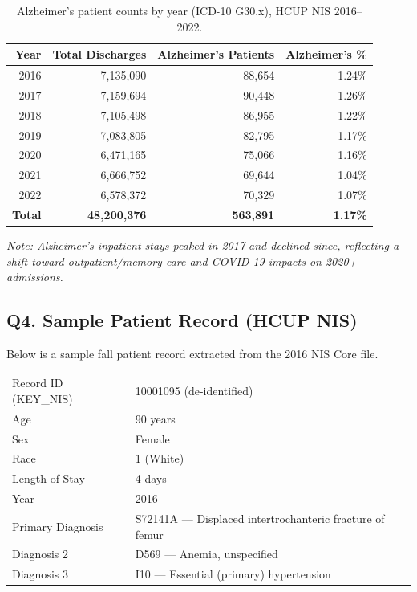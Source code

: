 \documentclass[11pt, a4paper]{article}
\begin{document}
\begin{table}[H]
\centering
\renewcommand{\arraystretch}{1.3}
\begin{tabular}{rrrr}
\toprule
\textbf{Year} & \textbf{Total Discharges} & \textbf{Alzheimer's Patients} & \textbf{Alzheimer's \%} \\
\midrule
2016 & 7,135,090 &  88,654 & 1.24\% \\
2017 & 7,159,694 &  90,448 & 1.26\% \\
2018 & 7,105,498 &  86,955 & 1.22\% \\
2019 & 7,083,805 &  82,795 & 1.17\% \\
2020 & 6,471,165 &  75,066 & 1.16\% \\
2021 & 6,666,752 &  69,644 & 1.04\% \\
2022 & 6,578,372 &  70,329 & 1.07\% \\
\midrule
\textbf{Total} & \textbf{48,200,376} & \textbf{563,891} & \textbf{1.17\%} \\
\bottomrule
\end{tabular}
\caption{Alzheimer's patient counts by year (ICD-10 G30.x), HCUP NIS 2016--2022.}
\end{table}

\noindent\textit{Note: Alzheimer's inpatient stays peaked in 2017 and declined since, reflecting a shift toward outpatient/memory care and COVID-19 impacts on 2020+ admissions.}

\vspace{6pt}

\subsection*{Q4. Sample Patient Record (HCUP NIS)}
\begin{answerbox}
Below is a sample fall patient record extracted from the 2016 NIS Core file.
\end{answerbox}

\begin{samplebox}
\begin{tabular}{ll}
Record ID (KEY\_NIS)  & 10001095 (de-identified) \\
Age                   & 90 years \\
Sex                   & Female \\
Race                  & 1 (White) \\
Length of Stay        & 4 days \\
Year                  & 2016 \\
Primary Diagnosis     & S72141A --- Displaced intertrochanteric fracture of femur \\
Diagnosis 2           & D569 --- Anemia, unspecified \\
Diagnosis 3           & I10 --- Essential (primary) hypertension \\
\end{tabular}
\end{samplebox}
\end{document}
